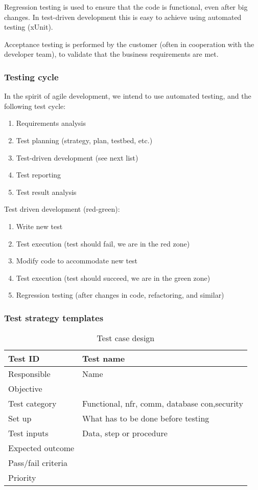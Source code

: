 Regression testing is used to ensure that the code is functional, even after big
changes. In test-driven development this is easy to achieve using automated
testing (xUnit).

Acceptance testing is performed by the customer (often in cooperation with the
developer team), to validate that the business requirements are met.

\subsubsection{Testing cycle}

In the spirit of agile development, we intend to use automated testing, and the
following test cycle:

\begin{enumerate}
	\item Requirements analysis
	\item Test planning (strategy, plan, testbed, etc.)
	\item Test-driven development (see next list)
	\item Test reporting
	\item Test result analysis
\end{enumerate}

Test driven development (red-green):
\begin{enumerate}
	\item Write new test
	\item Test execution (test should fail, we are in the red zone)
	\item Modify code to accommodate new test
	\item Test execution (test should succeed, we are in the green zone)
	\item Regression testing (after changes in code, refactoring, and similar)
\end{enumerate}

\subsubsection{Test strategy templates}

\begin{table}[htb]
	\centering
    \begin{tabular}{| l | l |}
		\hline
		Test ID & Test name \\ \hline
		Responsible & Name \\ \hline
		Objective &  \\ \hline
		Test category & Functional, nfr, comm, database con,security \\ \hline
		Set up & What has to be done before testing \\ \hline
		Test inputs & Data, step or procedure \\ \hline
		Expected outcome & \\ \hline
		Pass/fail criteria & \\ \hline
		Priority & \\ \hline
    \end{tabular}
  \caption{Test case design}
\end{table}

